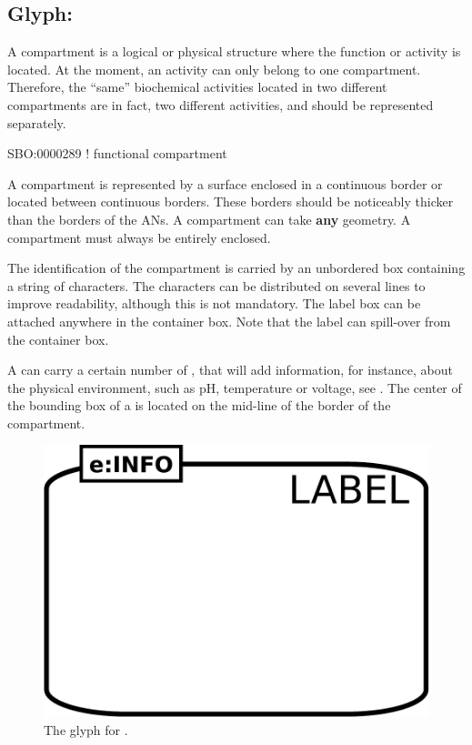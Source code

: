 \subsection{Glyph: }\label{sec:compartment}

A compartment is a logical or physical structure where the function or activity is located.  At the moment, an activity can only belong to one compartment. Therefore, the ``same'' biochemical activities located in two different compartments are in fact, two different activities, and should be represented separately.

\begin{glyphDescription}

\glyphSboTerm  SBO:0000289 ! functional compartment

\glyphContainer A compartment is represented by a surface enclosed in a continuous border or located between continuous borders. These borders should be noticeably thicker than the borders of the ANs. A compartment can take \textbf{any} geometry. A compartment must always be entirely enclosed.

\glyphLabel The identification of the compartment is carried by an unbordered box containing a string of characters. The characters can be distributed on several lines to improve readability, although this is not mandatory. The label box can be attached anywhere in the container box. Note that the label can spill-over from the container box.

\glyphAux A  can carry a certain number of , that will add information, for instance, about the physical environment, such as pH, temperature or voltage, see .  The center of the bounding box of a  is located on the mid-line of the border of the compartment.

\end{glyphDescription}

\begin{figure}[H]
  \centering
  \includegraphics[scale = 0.3]{images/build/compartment.pdf}
  \caption{The \AF glyph for .}
  \label{fig:af:compartment}
\end{figure}

